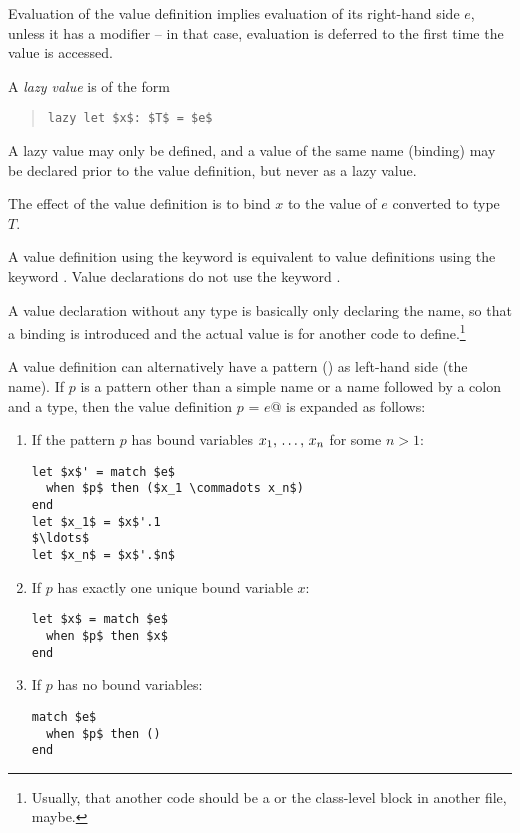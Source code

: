 Evaluation of the value definition implies evaluation of its right-hand side $e$, unless it has a modifier  -- in that case, evaluation is deferred to the first time the value is accessed. 

A {\em lazy value} is of the form
\begin{quote}\begin{lstlisting}
lazy let $x$: $T$ = $e$
\end{lstlisting}\end{quote}

A lazy value may only be defined, and a value of the same name (binding) may be declared prior to the value definition, but never as a lazy value. 

The effect of the value definition is to bind $x$ to the value of $e$ converted to type $T$. 

A value definition using the keyword  is equivalent to value definitions using the keyword . Value declarations do not use the keyword . 

A value declaration without any type is basically only declaring the name, so that a binding is introduced and the actual value is for another code to define.\footnote{Usually, that another code should be a  or the class-level block in another file, maybe.}

A value definition can alternatively have a pattern () as left-hand side (the name). If $p$ is a pattern other than a simple name or a name followed by a colon and a type, then the value definition \lstinline@val $p$ = $e$@ is expanded as follows: 

\begin{enumerate}
\item
If the pattern $p$ has bound variables $x_1 ,\, \ldots ,\, x_n$ for some $n > 1$:
\begin{lstlisting}[escapechar=@]
let $x$' = match $e$
  when $p$ then ($x_1 \commadots x_n$)
end
let $x_1$ = $x$'.1
$\ldots$
let $x_n$ = $x$'.$n$
\end{lstlisting}

\item
If $p$ has exactly one unique bound variable $x$:
\begin{lstlisting}
let $x$ = match $e$
  when $p$ then $x$
end
\end{lstlisting}

\item
If $p$ has no bound variables:
\begin{lstlisting}
match $e$
  when $p$ then ()
end
\end{lstlisting}
\end{enumerate}

